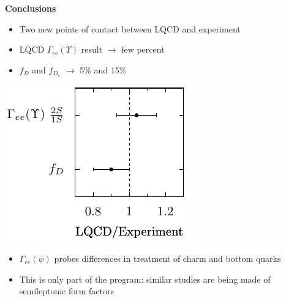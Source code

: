 \documentclass[landscape]{article}
\newenvironment{slide}[1][ ]{\mbox{\bf \boldmath #1 } \vfill}{\vfill \vspace{-1.5 cm} \mbox{ } \pagebreak}
\newenvironment{itemizer}[1]{\begin{itemize}\setlength{\itemsep}{#1}}{\end{itemize}}
\begin{document}
\begin{slide}[Conclusions]

\begin{minipage}{0.55\linewidth}
  \begin{itemizer}{0.75 cm}

    \item Two new points of contact between LQCD and experiment

    \item LQCD $\Gamma_{ee}(\Upsilon)$ result $\to$ few percent

    \item $f_D$ and $f_{D_s}$ $\to$ 5\% and 15\%

  \end{itemizer}
\end{minipage} \hfill \begin{minipage}{0.4\linewidth}
  \includegraphics[width=\linewidth]{new_ratio_plot2}
\end{minipage}

\vspace{0.5 cm}

\begin{itemizer}{0.75 cm}

  \item $\Gamma_{ee}(\psi)$ probes differences in treatment of charm and bottom quarks

  \item This is only part of the program: similar studies are being
  made of semileptonic form factors

\end{itemizer}

\end{slide}
\end{document}
